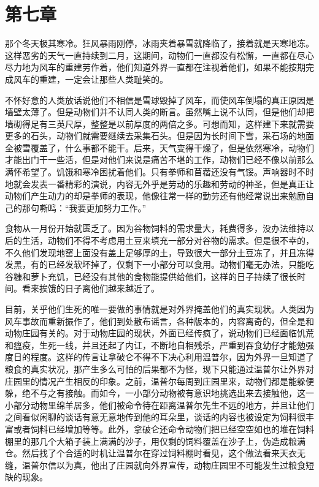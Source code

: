 \chapter{第七章}

那个冬天极其寒冷。狂风暴雨刚停，冰雨夹着暴雪就降临了，接着就是天寒地冻。这样恶劣的天气一直持续到二月，这期间，动物们一直都没有松懈，一直都在尽心尽力地为风车的重建劳作着，他们知道外界一直都在注视着他们，如果不能按期完成风车的重建，一定会让那些人类耻笑的。

不怀好意的人类放话说他们不相信是雪球毁掉了风车，而使风车倒塌的真正原因是墙壁太薄了。但是动物们并不认同人类的断言。虽然嘴上说不认同，但是他们却把墙砌得足有三英尺厚，整整是以前厚度的两倍之多。可想而知，这样建下来就需要更多的石头，动物们就需要继续去采集石头。但是因为长时间下雪，采石场的地面全被雪覆盖了，什么事都不能干。后来，天气变得干燥了，但是依然寒冷，动物们才能出门干一些活，但是对他们来说是痛苦不堪的工作，动物们已经不像以前那么满怀希望了。饥饿和寒冷困扰着他们。只有拳师和苜蓿还没有气馁。声响器时不时地就会发表一番精彩的演说，内容无外乎是劳动的乐趣和劳动的神圣，但是真正让动物们产生动力的却是拳师的表现，他像往常一样的勤劳还有他经常说出来勉励自己的那句嘶鸣：“我要更加努力工作。”

食物从一月份开始就匮乏了。因为谷物饲料的需求量大，耗费得多，没办法维持以后的生活，动物们不得不考虑用土豆来填充一部分对谷物的需求。但是很不幸的，不久他们发现地窖上面没有盖上足够厚的土，导致很大一部分土豆冻了，并且冻得发黑，有的已经发软坏掉了，仅剩下一小部分可以食用。动物们毫无办法，只能吃谷糠和萝卜充饥，已经没有其他的食物能提供给他们，这样的日子持续了很长时间。看来挨饿的日子离他们越来越近了。

目前，关乎他们生死的唯一要做的事情就是对外界掩盖他们的真实现状。人类因为风车事故而重新振作了，他们到处散布谣言，各种版本的，内容离奇的，但全是和动物庄园有关的。对于动物庄园的现状，外面已经传疯了，说动物们已经面临饥荒和瘟疫，生死一线，并且还起了内讧，不断地自相残杀，严重到吞食幼仔才能勉强度日的程度。这样的传言让拿破仑不得不下决心利用温普尔，因为外界一旦知道了粮食的真实状况，那产生多么可怕的后果都不为怪，现下只能通过温普尔让外界对庄园里的情况产生相反的印象。之前，温普尔每周到庄园里来，动物们都是能躲便躲，绝不与之有接触。而如今，一小部分动物被有意识地挑选出来去接触他，这一小部分动物里绵羊居多，他们被命令待在距离温普尔先生不远的地方，并且让他们之间看似闲聊的谈话有意无意地传到他的耳朵里，谈话的内容也被设定为饲料很丰富或者饲料已经增加等等。此外，拿破仑还命令动物们把已经空空如也的堆在饲料棚里的那几个大箱子装上满满的沙子，用仅剩的饲料覆盖在沙子上，伪造成粮满仓。然后找了个合适的时机让温普尔在穿过饲料棚时看见，这个做法看来天衣无缝，温普尔信以为真，他出了庄园就向外界宣传，动物庄园里不可能发生过粮食短缺的现象。

